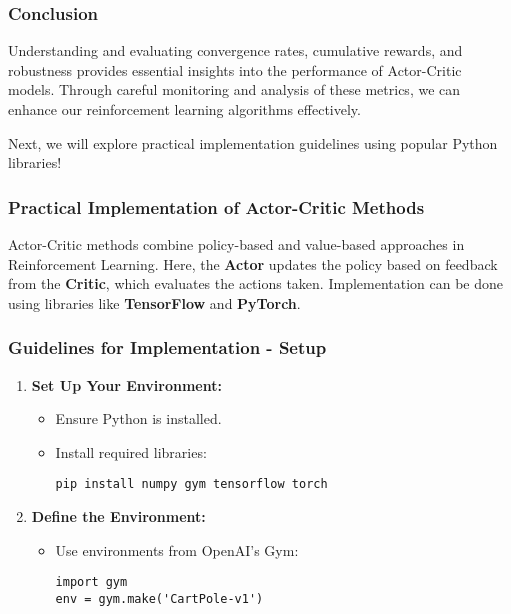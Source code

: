 \documentclass{beamer}
\begin{document}
\begin{frame}[fragile]
    \frametitle{Conclusion}
    Understanding and evaluating convergence rates, cumulative rewards, and robustness provides essential insights into the performance of Actor-Critic models. Through careful monitoring and analysis of these metrics, we can enhance our reinforcement learning algorithms effectively.
    
    Next, we will explore practical implementation guidelines using popular Python libraries!
\end{frame}

\begin{frame}[fragile]
    \frametitle{Practical Implementation of Actor-Critic Methods}
    Actor-Critic methods combine policy-based and value-based approaches in Reinforcement Learning. Here, the \textbf{Actor} updates the policy based on feedback from the \textbf{Critic}, which evaluates the actions taken. Implementation can be done using libraries like \textbf{TensorFlow} and \textbf{PyTorch}.
\end{frame}

\begin{frame}[fragile]
    \frametitle{Guidelines for Implementation - Setup}
    \begin{enumerate}
        \item \textbf{Set Up Your Environment:}
        \begin{itemize}
            \item Ensure Python is installed.
            \item Install required libraries:
            \begin{lstlisting}
pip install numpy gym tensorflow torch
            \end{lstlisting}
        \end{itemize}
        
        \item \textbf{Define the Environment:}
        \begin{itemize}
            \item Use environments from OpenAI's Gym:
            \begin{lstlisting}
import gym
env = gym.make('CartPole-v1')
            \end{lstlisting}
        \end{itemize}
    \end{enumerate}
\end{frame}
\end{document}
